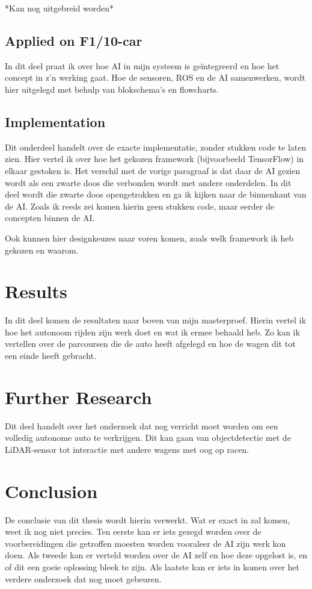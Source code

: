 \documentclass[conference,a4paper]{IEEEtran}
\begin{document}
*Kan nog uitgebreid worden*

\subsection{Applied on F1/10-car}
In dit deel praat ik over hoe AI in mijn systeem is ge\"{i}ntegreerd en hoe het concept in z'n werking gaat. Hoe de sensoren, ROS en de AI samenwerken, wordt hier uitgelegd met behulp van blokschema's en flowcharts. 

\subsection{Implementation}
Dit onderdeel handelt over de exacte implementatie, zonder stukken code te laten zien. Hier vertel ik over hoe het gekozen framework (bijvoorbeeld TensorFlow) in elkaar gestoken is. Het verschil met de vorige paragraaf is dat daar de AI gezien wordt als een zwarte doos die verbonden wordt met andere onderdelen. In dit deel wordt die zwarte doos opengetrokken en ga ik kijken naar de binnenkant van de AI. Zoals ik reeds zei komen hierin geen stukken code, maar eerder de concepten binnen de AI.

Ook kunnen hier designkeuzes naar voren komen, zoals welk framework ik heb gekozen en waarom. 

\section{Results}
In dit deel komen de resultaten naar boven van mijn masterproef. Hierin vertel ik hoe het autonoom rijden zijn werk doet en wat ik ermee behaald heb. Zo kan ik vertellen over de parcoursen die de auto heeft afgelegd en hoe de wagen dit tot een einde heeft gebracht. 

\section{Further Research}
Dit deel handelt over het onderzoek dat nog verricht moet worden om een volledig autonome auto te verkrijgen. Dit kan gaan van objectdetectie met de LiDAR-sensor tot interactie met andere wagens met oog op racen.

\section{Conclusion}
De conclusie van dit thesis wordt hierin verwerkt. Wat er exact in zal komen, weet ik nog niet precies. Ten eerste kan er iets gezegd worden over de voorbereidingen die getroffen moesten worden vooraleer de AI zijn werk kon doen. Als tweede kan er verteld worden over de AI zelf en hoe deze opgelost is, en of dit een goeie oplossing bleek te zijn. Als laatste kan er iets in komen over het verdere onderzoek dat nog moet gebeuren. 
\end{document}
